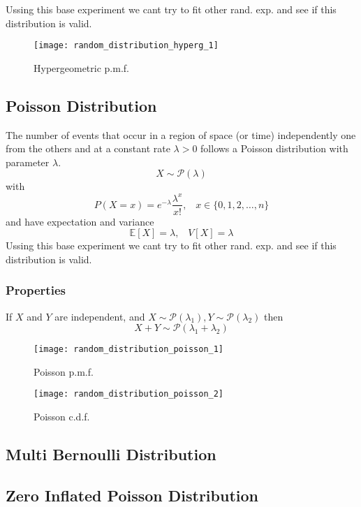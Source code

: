  Ussing this base
experiment we cant try to fit other rand. exp. and see if this distribution is
valid.
\begin{figure}[!ht]
    \begin{center}
        \texttt{[image: random\_distribution\_hyperg\_1]}
        \caption{Hypergeometric p.m.f.}
    \end{center}
\end{figure}

\subsection{Poisson Distribution}
The number of events that occur in a region of space (or time) independently one
from the others and at a constant rate $\lambda >0$ follows a Poisson
distribution with parameter $\lambda$.
\[ X \sim \mathcal{P}(\lambda)\] with
\[ P(X=x) = e^{-\lambda}\frac{\lambda^x}{x!},\;\;\; x \in \{0,1,2,\dots,n\} \]
and have expectation and variance
\[ \mathbb{E}[X] = \lambda,\;\;\; V[X] = \lambda \]  Ussing this base experiment we cant try to fit other
rand. exp. and see if this distribution is valid.
\subsubsection{Properties}
If $X$ and $Y$ are independent, and $X \sim \mathcal{P}(\lambda_1), Y \sim
\mathcal{P}(\lambda_2)$ then 
\[ X+Y \sim \mathcal{P}(\lambda_1+\lambda_2) \]

\begin{figure}[!ht]
    \begin{minipage}{0.45\linewidth}
      \texttt{[image: random\_distribution\_poisson\_1]}
      \caption{Poisson p.m.f.}
    \end{minipage}
    \hfill
    \begin{minipage}{0.45\linewidth}
      \texttt{[image: random\_distribution\_poisson\_2]}
      \caption{Poisson c.d.f.}
    \end{minipage}
\end{figure}

\subsection{Multi Bernoulli Distribution}


\subsection{Zero Inflated Poisson Distribution}


